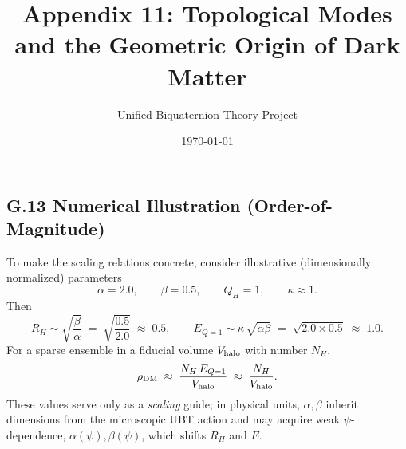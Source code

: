 \subsection*{G.13 Numerical Illustration (Order-of-Magnitude)}
To make the scaling relations concrete, consider illustrative (dimensionally normalized) parameters
\begin{equation}
\alpha = 2.0,\qquad \beta = 0.5,\qquad Q_H=1,\qquad \kappa \approx 1.
\end{equation}
Then
\begin{equation}
R_H \sim \sqrt{\frac{\beta}{\alpha}} \;=\; \sqrt{\frac{0.5}{2.0}} \;\approx\; 0.5,\qquad
E_{Q=1} \sim \kappa\,\sqrt{\alpha\beta} \;=\; \sqrt{2.0\times 0.5} \;\approx\; 1.0.
\end{equation}
For a sparse ensemble in a fiducial volume $V_{\rm halo}$ with number $N_H$,
\begin{equation}
\rho_{\rm DM} \;\approx\; \frac{N_H\,E_{Q=1}}{V_{\rm halo}} \;\approx\; \frac{N_H}{V_{\rm halo}}.
\end{equation}
These values serve only as a \emph{scaling} guide; in physical units, $\alpha,\beta$ inherit dimensions from the microscopic UBT action and may acquire weak $\psi$-dependence, $\alpha(\psi),\beta(\psi)$, which shifts $R_H$ and $E$.

\documentclass[12pt]{article}
\usepackage{amsmath,amssymb,graphicx,geometry}
\geometry{margin=1in}
\title{Appendix 11: Topological Modes and the Geometric Origin of Dark Matter}
\author{Unified Biquaternion Theory Project}
\date{\today}



\maketitle

\section*{Abstract}
We present a theoretical framework within the Unified Biquaternion Theory (UBT) in which dark matter arises naturally from topologically stable, electromagnetically neutral configurations of the fundamental field \( \Theta(q, \tau) \) in complexified spacetime \( ^4 \). These configurations, termed "dark modes," carry gravitational mass-energy without electromagnetic interactions and are protected by the topological properties of the field.

